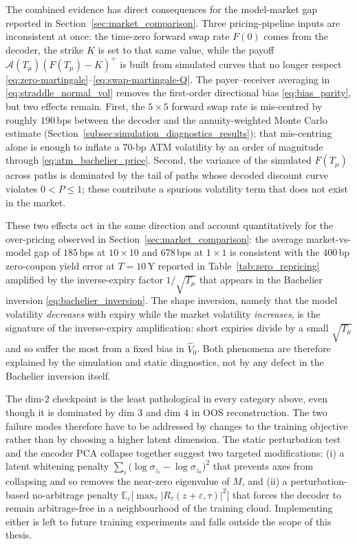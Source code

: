 The combined evidence has direct consequences for the
model-market gap reported in Section~\ref{sec:market_comparison}.
Three pricing-pipeline inputs are inconsistent at once: the
time-zero forward swap rate $F(0)$ comes from the decoder, the
strike $K$ is set to that same value, while the payoff
$\mathcal A(T_\mu)(F(T_\mu)-K)^+$ is built from simulated curves
that no longer respect
\eqref{eq:zero-martingale}--\eqref{eq:swap-martingale-Q}. The
payer--receiver averaging in \eqref{eq:straddle_normal_vol} removes
the first-order directional bias \eqref{eq:bias_parity}, but two
effects remain. First, the $5\!\times\!5$ forward swap rate is
mis-centred by roughly $190$\,bps between the decoder and the
annuity-weighted Monte Carlo estimate
(Section~\ref{subsec:simulation_diagnostics_results}); that
mis-centring alone is enough to inflate a $70$-bp ATM
volatility by an order of magnitude through
\eqref{eq:atm_bachelier_price}. Second, the variance of the
simulated $F(T_\mu)$ across paths is dominated by the tail of paths
whose decoded discount curve violates $0<P\le1$; these contribute a
spurious volatility term that does not exist in the market.

These two effects act in the same direction and account
quantitatively for the over-pricing observed in
Section~\ref{sec:market_comparison}: the average market-vs-model
gap of $185$\,bps at $10\!\times\!10$ and $678$\,bps at
$1\!\times\!1$ is consistent with the $400$\,bp zero-coupon yield
error at $T=10$\,Y reported in Table~\ref{tab:zero_repricing}
amplified by the inverse-expiry factor $1/\sqrt{T_\mu}$ that appears
in the Bachelier inversion \eqref{eq:bachelier_inversion}. The shape
inversion, namely that the model volatility \emph{decreases} with
expiry while the market volatility \emph{increases}, is the
signature of the inverse-expiry amplification: short expiries divide
by a small $\sqrt{T_\mu}$ and so suffer the most from a fixed bias
in $\widehat V_0$. Both phenomena are therefore explained by the
simulation and static diagnostics, not by any defect in the
Bachelier inversion itself.

The dim-$2$ checkpoint is the least pathological in every category
above, even though it is dominated by dim $3$ and dim $4$ in OOS
reconstruction. The two failure modes therefore have to be
addressed by changes to the training objective rather than by
choosing a higher latent dimension. The static perturbation test
and the encoder PCA collapse together suggest two targeted
modifications: (i) a latent whitening penalty
$\sum_i\bigl(\log\sigma_{z_i}-\log\sigma_{z_0}\bigr)^{\!2}$ that
prevents axes from collapsing and so removes the near-zero
eigenvalue of $M$, and (ii) a perturbation-based no-arbitrage
penalty
$\mathbb E_{\varepsilon}\!\bigl[\max_\tau\lvert R_\tau(z+\varepsilon,\tau)\rvert^{2}\bigr]$
that forces the decoder to remain arbitrage-free in a neighbourhood
of the training cloud. Implementing either is left to future
training experiments and falls outside the scope of this thesis.
